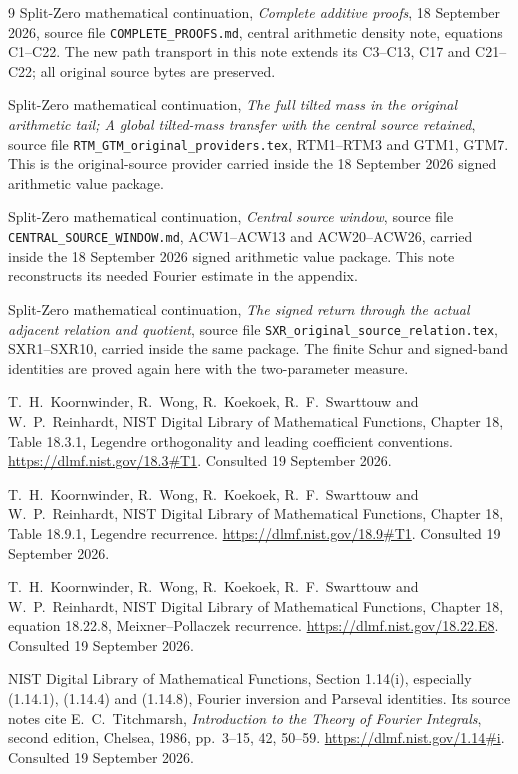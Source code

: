 \documentclass[11pt]{article}
\begin{document}
\begin{thebibliography}{9}
Split-Zero mathematical continuation,
\emph{Complete additive proofs}, 18 September 2026,
source file \texttt{COMPLETE\_PROOFS.md},
central arithmetic density note, equations C1--C22.
The new path transport in this note extends its C3--C13,
C17 and C21--C22; all original source bytes are preserved.

Split-Zero mathematical continuation,
\emph{The full tilted mass in the original arithmetic tail;
A global tilted-mass transfer with the central source retained},
source file \texttt{RTM\_GTM\_original\_providers.tex},
RTM1--RTM3 and GTM1, GTM7.
This is the original-source provider carried inside the
18 September 2026 signed arithmetic value package.

Split-Zero mathematical continuation,
\emph{Central source window},
source file \texttt{CENTRAL\_SOURCE\_WINDOW.md},
ACW1--ACW13 and ACW20--ACW26,
carried inside the 18 September 2026 signed arithmetic
value package.  This note reconstructs its needed Fourier
estimate in the appendix.

Split-Zero mathematical continuation,
\emph{The signed return through the actual adjacent relation and quotient},
source file \texttt{SXR\_original\_source\_relation.tex},
SXR1--SXR10, carried inside the same package.
The finite Schur and signed-band identities are proved
again here with the two-parameter measure.

T.\ H.\ Koornwinder, R.\ Wong, R.\ Koekoek, R.\ F.\ Swarttouw
and W.\ P.\ Reinhardt,
NIST Digital Library of Mathematical Functions,
Chapter 18, Table 18.3.1, Legendre orthogonality and leading
coefficient conventions.
\url{https://dlmf.nist.gov/18.3#T1}.
Consulted 19 September 2026.

T.\ H.\ Koornwinder, R.\ Wong, R.\ Koekoek, R.\ F.\ Swarttouw
and W.\ P.\ Reinhardt,
NIST Digital Library of Mathematical Functions,
Chapter 18, Table 18.9.1, Legendre recurrence.
\url{https://dlmf.nist.gov/18.9#T1}.
Consulted 19 September 2026.

T.\ H.\ Koornwinder, R.\ Wong, R.\ Koekoek, R.\ F.\ Swarttouw
and W.\ P.\ Reinhardt,
NIST Digital Library of Mathematical Functions,
Chapter 18, equation 18.22.8, Meixner--Pollaczek recurrence.
\url{https://dlmf.nist.gov/18.22.E8}.
Consulted 19 September 2026.

NIST Digital Library of Mathematical Functions,
Section 1.14(i), especially (1.14.1), (1.14.4) and (1.14.8),
Fourier inversion and Parseval identities.
Its source notes cite E.\ C.\ Titchmarsh,
\emph{Introduction to the Theory of Fourier Integrals},
second edition, Chelsea, 1986, pp.\ 3--15, 42, 50--59.
\url{https://dlmf.nist.gov/1.14#i}.
Consulted 19 September 2026.
\end{thebibliography}
\end{document}
